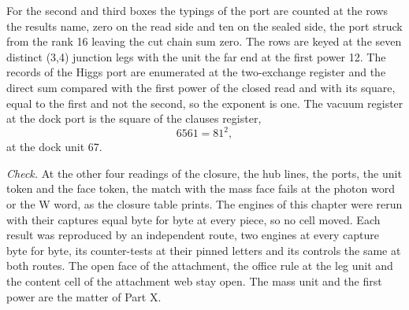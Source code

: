 \begin{chproof}[census]
For the second and third boxes the typings of the port are counted at the rows the results name, zero on the read side and ten on the sealed side, the port struck from the rank 16 leaving the cut chain sum zero. The rows are keyed at the seven distinct (3,4) junction legs with the unit the far end at the first power 12. The records of the Higgs port are enumerated at the two-exchange register and the direct sum compared with the first power of the closed read and with its square, equal to the first and not the second, so the exponent is one. The vacuum register at the dock port is the square of the clauses register,
\begin{equation}
6561 = 81^{2} ,
\end{equation}
at the dock unit 67.

\emph{Check.} At the other four readings of the closure, the hub lines, the ports, the unit token and the face token, the match with the mass face fails at the photon word or the W word, as the closure table prints. The engines of this chapter were rerun with their captures equal byte for byte at every piece, so no cell moved. Each result was reproduced by an independent route, two engines at every capture byte for byte, its counter-tests at their pinned letters and its controls the same at both routes.
The open face of the attachment, the office rule at the leg unit and the content cell of the attachment web stay open. The mass unit and the first power are the matter of Part X.
\end{chproof}
\label{chend:VI-10-higgs-the-closed-hub-read-its-rows-its-mass-and-its-exponent}
